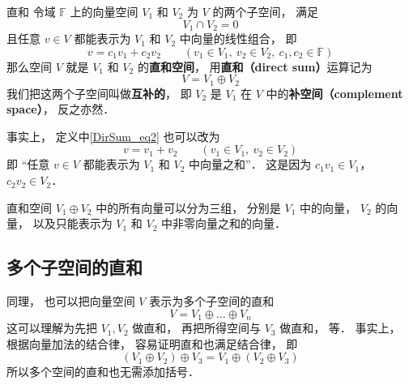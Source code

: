 
\begin{issues}
\issueTODO
\end{issues}

\begin{definition}{直和}\label{DirSum_def1}
令域 $\mathbb F$ 上的向量空间 $V_1$ 和 $V_2$ 为 $V$ 的两个子空间， 满足
\begin{equation}
V_1 \cap V_2 = \qty{0}
\end{equation}
且任意 ${v} \in V$ 都能表示为 $V_1$ 和 $V_2$ 中向量的线性组合， 即
\begin{equation}\label{DirSum_eq2}
{v} = c_1 {v_1} + c_2 {v_2}
\qquad
({v_1} \in V_1,\ {v_2} \in V_2,\ c_1, c_2 \in \mathbb F)
\end{equation}
那么空间 $V$ 就是 $V_1$ 和 $V_2$ 的\textbf{直和空间}， 用\textbf{直和（direct sum）}运算记为
\begin{equation}
V = V_1 \oplus V_2
\end{equation}
我们把这两个子空间叫做\textbf{互补的}， 即 $V_2$ 是 $V_1$ 在 $V$ 中的\textbf{补空间（complement space）}， 反之亦然．
\end{definition}

事实上， 定义中\autoref{DirSum_eq2} 也可以改为
\begin{equation}
{v} = {v_1} + {v_2} \qquad
({v_1} \in V_1,\ {v_2} \in V_2)
\end{equation}
即 “任意 ${v} \in V$ 都能表示为 $V_1$ 和 $V_2$ 中向量之和”． 这是因为 $c_1 v_1 \in V_1$， $c_2 v_2 \in V_2$．

直和空间 $V_1 \oplus V_2$ 中的所有向量可以分为三组， 分别是 $V_1$ 中的向量， $V_2$ 的向量， 以及只能表示为 $V_1$ 和 $V_2$ 中非零向量之和的向量．

\subsection{多个子空间的直和}
同理， 也可以把向量空间 $V$ 表示为多个子空间的直和
\begin{equation}
V = V_1 \oplus \dots \oplus V_n
\end{equation}
这可以理解为先把 $V_1, V_2$ 做直和， 再把所得空间与 $V_3$ 做直和， 等． 事实上， 根据向量加法的结合律， 容易证明直和也满足结合律， 即
\begin{equation}
(V_1 \oplus V_2) \oplus V_3 = V_1 \oplus (V_2 \oplus V_3)
\end{equation}
所以多个空间的直和也无需添加括号．

